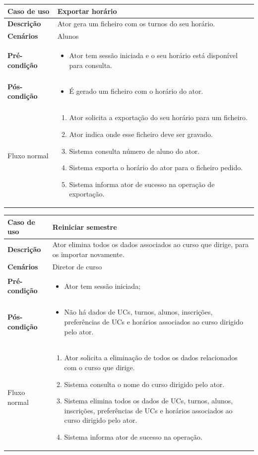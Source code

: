 \documentclass[12pt, a4paper]{article}
\newenvironment{condition}{
    \begin{itemize}[wide=0pt]
        \vspace{-0.2cm}
}{
        \vspace{-0.5cm}
    \end{itemize}
}
\newcommand\flow[1]{
    Fluxo normal &
    \singlespacing
    \begin{enumerate}[wide=0pt]
        #1
        \vspace{-0.3cm}
    \end{enumerate} \\ \hline
}
\newenvironment{usecase}[5]{
    \begin{table}[H]
        \centering
        \begin{tabular}{|>{\centering\arraybackslash\bf}m{3cm}|m{13cm}|}
            \hline
            Caso de uso & \textbf{#1} \\

            \hline
            Descrição & #2 \\

            \hline
            Cenários & #3 \\

            \hline
            Pré-condição &
            \begin{condition}
                #4
            \end{condition} \\

            \hline
            Pós-condição &
            \begin{condition}
                #5
            \end{condition} \\

            \hline
}{
    \end{tabular}
\end{table}
}
\begin{document}
\begin{usecase}
    {Exportar horário}
    {Ator gera um ficheiro com os turnos do seu horário.}
    {Alunos}
    {\item Ator tem sessão iniciada e o seu horário está disponível para consulta.}
    {\item É gerado um ficheiro com o horário do ator.}

    \flow{
        \item Ator solicita a exportação do seu horário para um ficheiro.
        \item Ator indica onde esse ficheiro deve ser gravado.
        \item Sistema consulta número de aluno do ator.
        \item Sistema exporta o horário do ator para o ficheiro pedido.
        \item Sistema informa ator de sucesso na operação de exportação.
    }
\end{usecase}

\begin{usecase}
    {Reiniciar semestre}
    {Ator elimina todos os dados associados ao curso que dirige, para os importar novamente.}
    {Diretor de curso}
    {\item Ator tem sessão iniciada;}
    {
        \item Não há dados de UCs, turnos, alunos, inscrições, preferências de UCs e horários
            associados ao curso dirigido pelo ator.
    }

    \flow{
        \item Ator solicita a eliminação de todos os dados relacionados com o curso que dirige.
        \item Sistema consulta o nome do curso dirigido pelo ator.
        \item Sistema elimina todos os dados de UCs, turnos, alunos, inscrições, preferências de UCs
            e horários associados ao curso dirigido pelo ator.
        \item Sistema informa ator de sucesso na operação.
    }
\end{usecase}
\end{document}
